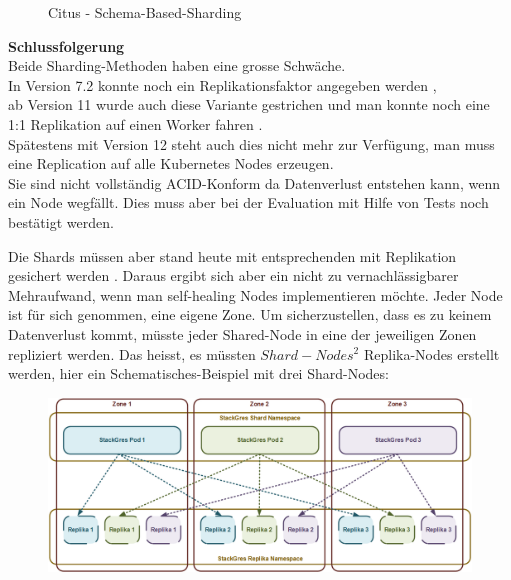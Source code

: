 \begin{flushleft}
\begin{flushleft}
\begin{flushleft}
\begin{figure}[H]
                \caption{Citus - Schema-Based-Sharding}
                \label{fig:citus_schema-based-sharding}
            \end{figure}
        \end{flushleft}
        \begin{flushleft}
            \textbf{Schlussfolgerung}\\
            Beide Sharding-Methoden haben eine grosse Schwäche.\\
            In Version 7.2 konnte noch ein Replikationsfaktor angegeben werden \cite{8W58EW47},\\
            ab Version 11 wurde auch diese Variante gestrichen und man konnte noch eine 1:1 Replikation auf einen Worker fahren \cite{JWYDYYWQ}.\\
            Spätestens mit Version 12 steht auch dies nicht mehr zur Verfügung, man muss eine Replication auf alle \Gls{Kubernetes} Nodes erzeugen.\\
            Sie sind nicht vollständig ACID-Konform da Datenverlust entstehen kann, wenn ein Node wegfällt.
            Dies muss aber bei der Evaluation mit Hilfe von Tests noch bestätigt werden.
        \end{flushleft}
        \begin{flushleft}
            Die Shards müssen aber stand heute mit entsprechenden mit Replikation gesichert werden  \cite{4GDXA49I}.
            Daraus ergibt sich aber ein nicht zu vernachlässigbarer Mehraufwand, wenn man self-healing Nodes implementieren möchte.
            Jeder Node ist für sich genommen, eine eigene Zone. Um sicherzustellen, dass es zu keinem Datenverlust kommt,
            müsste jeder Shared-Node in eine der jeweiligen Zonen repliziert werden.
            Das heisst, es müssten \(Shard-Nodes^2 \) Replika-Nodes erstellt werden, hier ein Schematisches-Beispiel mit drei Shard-Nodes:
            \begin{figure}[H]
                \centering
                \includegraphics[width=0.8\linewidth]{source/implementation/evaluation/postgresql_ha_solutions/stackgres/stackgres_shard_replication}

\end{figure}
\end{flushleft}
\end{flushleft}
\end{flushleft}

